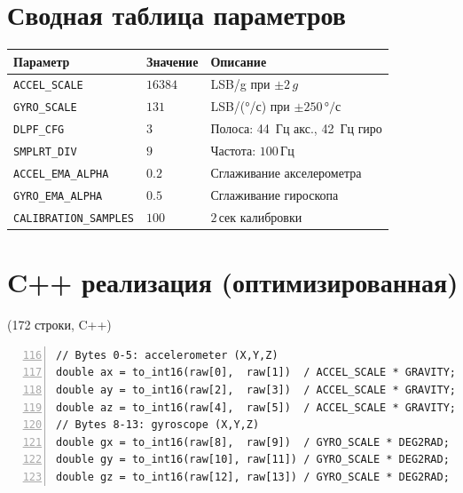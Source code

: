 \section{Сводная таблица параметров}

\begin{center}
\begin{tabular}{lll}
\toprule
\textbf{Параметр} & \textbf{Значение} & \textbf{Описание}\\
\midrule
\texttt{ACCEL\_SCALE} & $16384$ & LSB/g при $\pm 2\,g$\\
\texttt{GYRO\_SCALE}  & $131$   & LSB/(°/с) при $\pm 250\,\text{°/с}$\\
\texttt{DLPF\_CFG}    & $3$     & Полоса: 44~Гц акс., 42~Гц гиро\\
\texttt{SMPLRT\_DIV}  & $9$     & Частота: $100\,\text{Гц}$\\
\texttt{ACCEL\_EMA\_ALPHA} & $0.2$ & Сглаживание акселерометра\\
\texttt{GYRO\_EMA\_ALPHA}  & $0.5$ & Сглаживание гироскопа\\
\texttt{CALIBRATION\_SAMPLES} & $100$ & $2\,\text{сек}$ калибровки\\
\bottomrule
\end{tabular}
\end{center}

\section{C++ реализация (оптимизированная)}

\begin{filebox}[title={Файл исходного кода}]
 \quad (172 строки, C++)
\end{filebox}

\begin{filebox}[title={\filepath{imu\_node.cpp}, строки 90--127 --- readRaw()}]
\begin{lstlisting}[style=cppstyle, numbers=left, firstnumber=116]
// Bytes 0-5: accelerometer (X,Y,Z)
double ax = to_int16(raw[0],  raw[1])  / ACCEL_SCALE * GRAVITY;
double ay = to_int16(raw[2],  raw[3])  / ACCEL_SCALE * GRAVITY;
double az = to_int16(raw[4],  raw[5])  / ACCEL_SCALE * GRAVITY;
// Bytes 8-13: gyroscope (X,Y,Z)
double gx = to_int16(raw[8],  raw[9])  / GYRO_SCALE * DEG2RAD;
double gy = to_int16(raw[10], raw[11]) / GYRO_SCALE * DEG2RAD;
double gz = to_int16(raw[12], raw[13]) / GYRO_SCALE * DEG2RAD;
\end{lstlisting}
\end{filebox}

